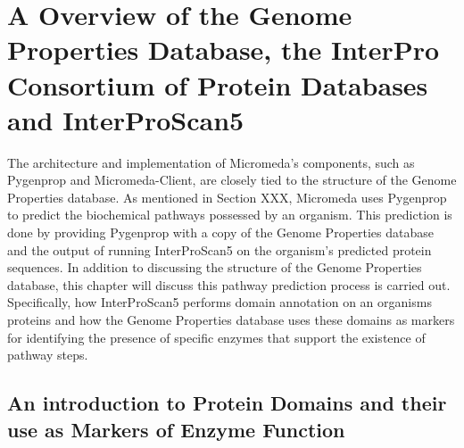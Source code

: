 \chapter{A Overview of the Genome Properties Database, the InterPro Consortium of Protein Databases and InterProScan5} \label{genome-properties-chapter} \label{genome-properties}

The architecture and implementation of Micromeda's components, such as Pygenprop and Micromeda-Client, are closely tied to the structure of the Genome Properties database. As mentioned in Section XXX, Micromeda uses Pygenprop to predict the biochemical pathways possessed by an organism. This prediction is done by providing Pygenprop with a copy of the Genome Properties database and the output of running InterProScan5 on the organism's predicted protein sequences. In addition to discussing the structure of the Genome Properties database, this chapter will discuss this pathway prediction process is carried out. Specifically, how InterProScan5 performs domain annotation on an organisms proteins and how the Genome Properties database uses these domains as markers for identifying the presence of specific enzymes that support the existence of pathway steps.

\section{An introduction to Protein Domains and their use as Markers of Enzyme Function}

